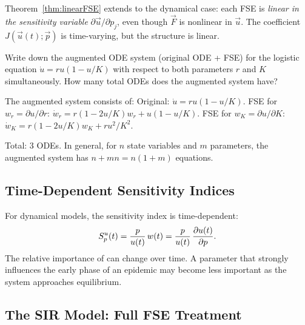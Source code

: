 Theorem~\ref{thm:linearFSE} extends to the dynamical case:
each FSE is \emph{linear in the sensitivity variable}
$\partial\vec{u}/\partial p_j$, even though $\vec{F}$ is nonlinear in $\vec{u}$.
The coefficient $J(\vec{u}(t); \vec{p})$ is time-varying, but the
structure is linear.

\begin{selfcheck}
Write down the augmented ODE system (original ODE + FSE) for the
logistic equation $\dot{u} = ru(1-u/K)$
with respect to both parameters $r$ and $K$ simultaneously.
How many total ODEs does the augmented system have?
\end{selfcheck}
\begin{scAnswer}
The augmented system consists of:
Original: $\dot{u} = ru(1-u/K)$.
FSE for $w_r = \partial u/\partial r$: $\dot{w}_r = r(1-2u/K)w_r + u(1-u/K)$.
FSE for $w_K = \partial u/\partial K$: $\dot{w}_K = r(1-2u/K)w_K + ru^2/K^2$.

Total: 3 ODEs. In general, for $n$ state variables and $m$ parameters,
the augmented system has $n + mn = n(1+m)$ equations.
\end{scAnswer}

\subsection{Time-Dependent Sensitivity Indices}

For dynamical models, the sensitivity index is time-dependent:
\begin{equation}
  S_{p}^{u}(t) = \frac{p}{u(t)}\,w(t) = \frac{p}{u(t)}\,\frac{\partial u(t)}{\partial p}.
  \label{eq:timeSI}
\end{equation}
The relative importance of \POIs can change over time.
A parameter that strongly influences the early phase of an epidemic
may become less important as the system approaches equilibrium.

\subsection{The SIR Model: Full FSE Treatment}
\label{subsec:sirfse}

